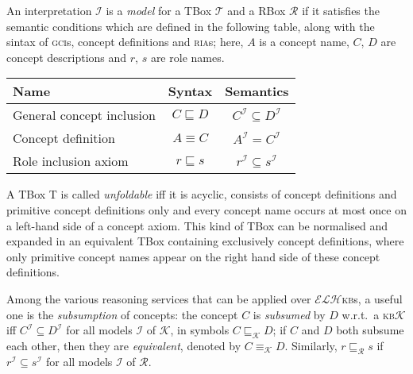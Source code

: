 \documentclass{llncs}
\newcommand{\elh}{\(\mathcal{ELH}\)\xspace}
\newcommand{\kb}{\textsc{kb}\xspace}
\newcommand{\ria}{\textsc{ria}\xspace}
\newcommand{\gci}{\textsc{gci}\xspace}
\newcommand{\subsume}[1]{\sqsubseteq_{\mathcal{#1}}}
\begin{document}
  An interpretation \(\mathcal{I}\) is a \emph{model} for a TBox \(\mathcal{T}\) and a RBox \(\mathcal{R}\) if it satisfies the semantic conditions which are defined in the following table, along with the sintax of \gci{}s, concept definitions and \ria{}s; here, \(A\) is a concept name, \(C\), \(D\) are concept descriptions and \(r\), \(s\) are role names.
  \begin{center}
    \begin{tabular}{lcc}
      \toprule
      Name & Syntax & Semantics \\
      \midrule
      General concept inclusion & \(C \sqsubseteq D\) & \(C^\mathcal{I} \subseteq D^\mathcal{I}\) \\
      Concept definition & \(A \equiv C\) & \(A^\mathcal{I} = C^\mathcal{I}\) \\
      Role inclusion axiom & \(r \sqsubseteq s\) & \(r^\mathcal{I} \subseteq s^\mathcal{I}\) \\
      \bottomrule
    \end{tabular}
  \end{center}
  A TBox T is called \emph{unfoldable} iff it is acyclic, consists of concept definitions and primitive concept definitions only and every concept name occurs at most once on a left-hand side of a concept axiom.
  This kind of TBox can be normalised and expanded in an equivalent TBox containing exclusively concept definitions, where only primitive concept names appear on the right hand side of these concept definitions.

  Among the various reasoning services that can be applied over \elh \kb{}s, a useful one is the \emph{subsumption} of concepts: the concept \(C\) is \emph{subsumed} by \(D\) w.r.t.\ a \kb \(\mathcal{K}\) iff \(C^\mathcal{I} \subseteq D^\mathcal{I}\) for all models \(\mathcal{I}\) of \(\mathcal{K}\), in symbols \(C \subsume{K} D\);
  if \(C\) and \(D\) both subsume each other, then they are \emph{equivalent}, denoted by \(C \equiv_{\mathcal{K}} D\).
  Similarly, \(r \subsume{R} s\) if \(r^\mathcal{I} \subseteq s^\mathcal{I}\) for all models \(\mathcal{I}\) of \(\mathcal{R}\).
\end{document}
